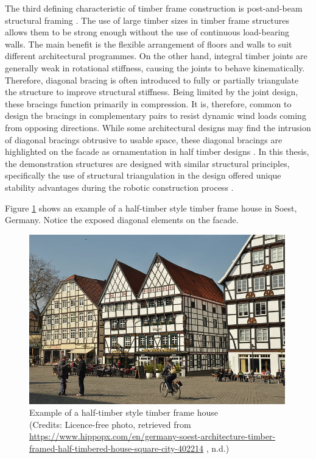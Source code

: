 The third defining characteristic of timber frame construction is post-and-beam structural framing \parencite{jacksobonHistoricAmericanTimber2014,sobonTimberFrameConstruction1984}. The use of large timber sizes in timber frame structures allows them to be strong enough without the use of continuous load-bearing walls. The main benefit is the flexible arrangement of floors and walls to suit different architectural programmes. 
On the other hand, integral timber joints are generally weak in rotational stiffness, causing the joints to behave kinematically. Therefore, diagonal bracing is often introduced to fully or partially triangulate the structure to improve structural stiffness. Being limited by the joint design, these bracings function primarily in compression. It is, therefore, common to design the bracings in complementary pairs to resist dynamic wind loads coming from opposing directions. While some architectural designs may find the intrusion of diagonal bracings obtrusive to usable space, these diagonal bracings are highlighted on the facade as ornamentation in half timber designs \parencite{gernerFachwerkEntwicklungGefuege1979}. In this thesis, the demonstration structures are designed with similar structural principles, specifically the use of structural triangulation in the design offered unique stability advantages during the robotic construction process  .

Figure \ref{fig:half-timber-frame-example} shows an example of a half-timber style timber frame house in Soest, Germany. Notice the exposed diagonal elements on the facade.

\begin{figure}
    \centering
    \includegraphics[width=0.99\textwidth]{images/01/germany-soest-architecture-timber-framed-preview.jpg}
    \caption[Example of a half-timber style timber frame house]
    {Example of a half-timber style timber frame house \\
        \footnotesize{(Credits: Licence-free photo, retrieved from \url{https://www.hippopx.com/en/germany-soest-architecture-timber-framed-half-timbered-house-square-city-402214} , n.d.)}}
    \label{fig:half-timber-frame-example}
\end{figure}



